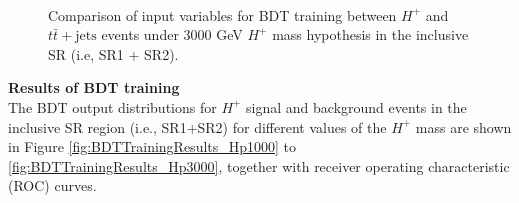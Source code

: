 \begin{description}
\begin{figure}[H]
{        \label{fig:SOVERB_leadingTop_mass_Hp3000_Contained80_DL1r_70}
      }
      \\
      \caption{Comparison of input variables for BDT training between $H^{+}$ and $t\bar{t}+\text{jets}$ events under 3000 GeV $H^{+}$ mass hypothesis in the inclusive SR (i.e, SR1 + SR2).}
      \label{fig:SOVERB_Hp3000_Contained80_DL1r_70}
    \end{figure}

    \item{\textbf{Results of BDT training}}\mbox{}\\
    The BDT output distributions for $H^{+}$ signal and background events in the inclusive SR region (i.e., SR1+SR2) for different values of the $H^+$ mass are shown in Figure \ref{fig:BDTTrainingResults_Hp1000} to \ref{fig:BDTTrainingResults_Hp3000}, together with receiver operating characteristic (ROC) curves.


\end{description}

